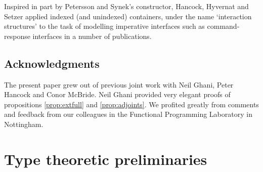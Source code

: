 \documentclass[10pt, conference, compsocconf]{IEEEtran}
\begin{document}
\noindent Inspired in part by Petersson and Synek's constructor,
Hancock, Hyvernat and Setzer \cite{hancock-apal06} applied indexed (and unindexed)
containers, under the name `interaction structures' to the task of
modelling imperative interfaces such as command-response interfaces in
a number of publications. 

\subsection*{Acknowledgments}
\label{sec:acknowledgements}

\noindent The present paper grew out of previous joint work with Neil
Ghani, Peter Hancock and Conor McBride. Neil Ghani provided very
elegant proofs of propositions \ref{prop:extfull} and
\ref{prop:adjoints}.  We profited greatly from comments and feedback from our
colleagues in the Functional Programming Laboratory in Nottingham.

\section{Type theoretic preliminaries}
\end{document}

